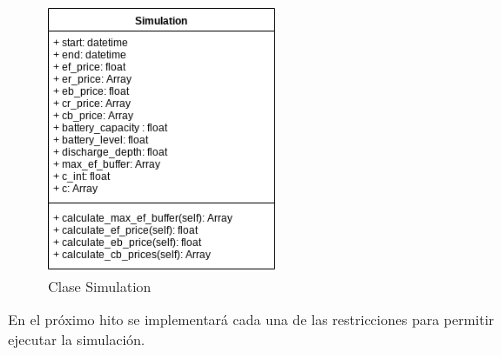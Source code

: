 \begin{figure}[H]
        \centering
        \includegraphics[width=6cm]{figs/simulation_class.png}
        \caption{Clase Simulation}
        \label{fig:simulation}
\end{figure}

En el próximo hito se implementará cada una de las restricciones para permitir ejecutar la simulación.
